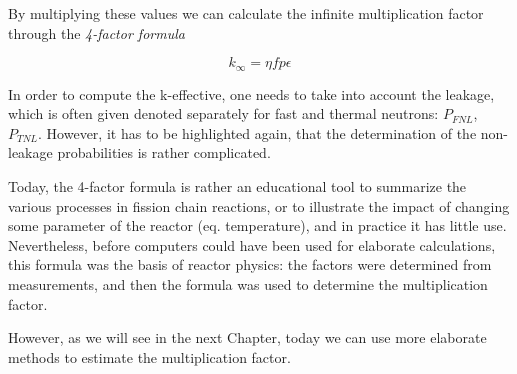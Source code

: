 By multiplying these values we can calculate the infinite multiplication factor through the \textit{4-factor formula}

$$k_{\infty}=\eta f p \epsilon$$

In order to compute the k-effective, one needs to take into account the leakage, which is often given denoted separately for fast and thermal neutrons: $P_{FNL}$, $P_{TNL}$. However, it has to be highlighted again, that the determination of the non-leakage probabilities is rather complicated.

Today, the 4-factor formula is rather an educational tool to summarize the various processes in fission chain reactions, or to illustrate the impact of changing some parameter of the reactor (eq. temperature), and in practice it has little use. Nevertheless, before computers could have been used for elaborate calculations, this formula was the basis of reactor physics: the factors were determined from measurements, and then the formula was used to determine the multiplication factor.

However, as we will see in the next Chapter, today we can use more elaborate methods to estimate the multiplication factor.

%

